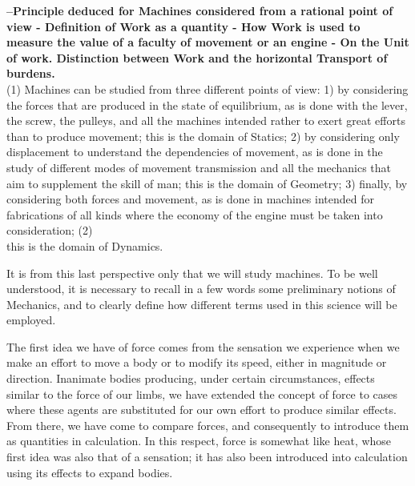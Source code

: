 \documentclass{book}
\begin{document}
\textbf{–Principle deduced for Machines considered from a rational point of view - Definition of Work as a quantity - How Work is used to measure the value of a faculty of movement or an engine - On the Unit of work. Distinction between Work and the horizontal Transport of burdens.}
\vspace{26pt}
\\
(1) Machines can be studied from three different points of view: 1) by considering the forces that are produced in the state of equilibrium, as is done with the lever, the screw, the pulleys, and all the machines intended rather to exert great efforts than to produce movement; this is the domain of Statics; 2) by considering only displacement to understand the dependencies of movement, as is done in the study of different modes of movement transmission and all the mechanics that aim to supplement the skill of man; this 
is the domain of Geometry; 3) finally, by considering both forces and movement, as is done in machines intended for fabrications of all kinds where the economy of the engine must be taken into consideration;
\newpage
(2) \\
this is the domain of Dynamics.


It is from this last perspective only that we will study machines. To be well understood, it is necessary to recall in a few words some preliminary notions of Mechanics, and to clearly define how different terms used in this science will be employed.

The first idea we have of force comes from the sensation we experience when we make an effort to move a body or to modify its speed, either in magnitude or direction. Inanimate bodies producing, under certain circumstances, effects similar to the force of our limbs, we have extended the concept of force to cases where these agents are substituted for our own effort to produce similar effects. From there, we have come to compare forces, and consequently to introduce them as quantities in calculation. In this respect, force is somewhat like heat, whose first idea was also that of a sensation; it has also been introduced into calculation using its effects to expand bodies.
\end{document}
